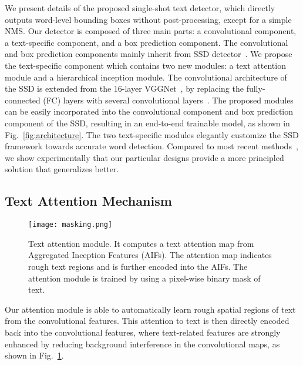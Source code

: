 \documentclass[10pt,twocolumn,letterpaper]{article}
\begin{document}
We present details of the proposed single-shot text detector, which directly outputs word-level bounding boxes without post-processing, except for a simple NMS. Our detector is composed of three main parts: a convolutional component, a text-specific component, and a box prediction component. The convolutional and box prediction components mainly inherit from SSD detector~\cite{liu2016SSD}. We propose the text-specific component which contains two new modules: a text attention module and a hierarchical inception module. The convolutional architecture of the SSD is extended from the 16-layer VGGNet~\cite{Simonyan2015}, by replacing the fully-connected (FC) layers with several convolutional layers~\cite{liu2016SSD}.
The proposed modules can be easily incorporated into the convolutional component and box prediction component of the SSD, resulting in an end-to-end trainable model, as shown in Fig.~\ref{fig:architecture}. The two text-specific modules elegantly customize the SSD framework towards accurate word detection.  Compared to most recent methods~\cite{Liu2017, Tian2016, Liao2017}, we show experimentally that our particular designs provide a more principled solution that generalizes better.

\subsection{Text Attention Mechanism}
\begin{figure}[t!]
   \centering
  \texttt{[image: masking.png]}
   \caption{Text attention module. It computes a text attention map from Aggregated Inception Features (AIFs). The attention map indicates rough text regions and is further encoded into the AIFs. The attention module is trained by using a pixel-wise  binary mask of text.}
   \label{fig:attention}
\end{figure}

Our attention module is able to automatically learn rough spatial regions of text from the convolutional features. This attention to text is then directly encoded back into the convolutional features, where text-related features are strongly enhanced by reducing background interference in the convolutional maps, as shown in Fig.~\ref{fig:attention}.
\end{document}
